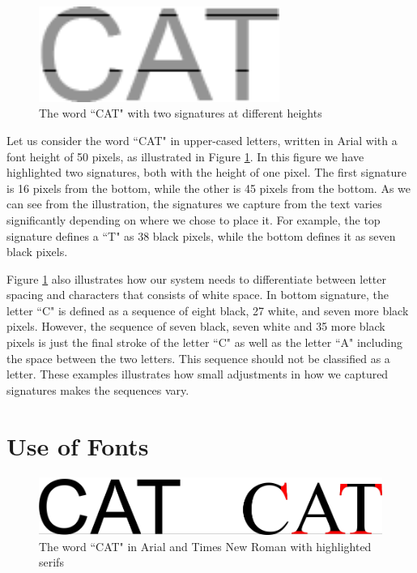 \begin{figure}[ht]
    \centering
    \includegraphics[width=0.7\textwidth]{fig/chapter2/signature_multiple.png}
    \caption{The word ``CAT" with two signatures at different heights}
    \label{fig:thesis-signature-comparison}
\end{figure}

Let us consider the word ``CAT" in upper-cased letters, written in Arial with a font height of 50 pixels, as illustrated in Figure \ref{fig:thesis-signature-comparison}. In this figure we have highlighted two signatures, both with the height of one pixel. The first signature is 16 pixels from the bottom, while the other is 45 pixels from the bottom. As we can see from the illustration, the signatures we capture from the text varies significantly depending on where we chose to place it. For example, the top signature defines a ``T" as 38 black pixels, while the bottom defines it as seven black pixels.

Figure \ref{fig:thesis-signature-comparison} also illustrates how our system needs to differentiate between letter spacing and characters that consists of white space. In bottom signature, the letter ``C" is defined as a sequence of eight black, 27 white, and seven more black pixels. However, the sequence of seven black, seven white and 35 more black pixels is just the final stroke of the letter ``C" as well as the letter ``A" including the space between the two letters. This sequence should not be classified as a letter. These examples illustrates how small adjustments in how we captured signatures makes the sequences vary.

\newpage


\section{Use of Fonts}
\label{sec:use_of_fonts}

\begin{figure}[h]
    \centering
    \includegraphics[width=1.0\textwidth]{fig/chapter2/typeface_comparison.png}
    \caption{The word ``CAT" in Arial and Times New Roman with highlighted serifs}
    \label{fig:typeface-comparison}
\end{figure}


